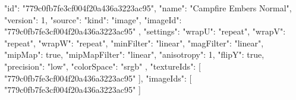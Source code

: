 {
  "id": "779c0fb7fe3cf004f20a436a3223ac95",
  "name": "Campfire Embers Normal",
  "version": 1,
  "source": {
    "kind": "image",
    "imageId": "779c0fb7fe3cf004f20a436a3223ac95"
  },
  "settings": {
    "wrapU": "repeat",
    "wrapV": "repeat",
    "wrapW": "repeat",
    "minFilter": "linear",
    "magFilter": "linear",
    "mipMap": true,
    "mipMapFilter": "linear",
    "anisotropy": 1,
    "flipY": true,
    "precision": "low",
    "colorSpace": "srgb"
  },
  "textureIds": [
    "779c0fb7fe3cf004f20a436a3223ac95"
  ],
  "imageIds": [
    "779c0fb7fe3cf004f20a436a3223ac95"
  ]
}

